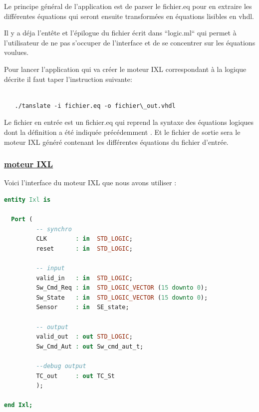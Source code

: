 \medskip

Le principe général de l'application est de parser le fichier.eq pour
en extraire les différentes équations qui seront ensuite transformées en
équations lisibles en vhdl.

\medskip

Il y a déja l'entête et l'épilogue du fichier écrit dans ``logic.ml`` qui
permet à l'utilisateur de ne pas s'occuper de l'interface et de se
concentrer sur les équations voulues.

\medskip

Pour lancer l'application qui va créer le moteur IXL correspondant à la logique décrite il faut taper l'instruction suivante:

\begin{lstlisting}

   ./tanslate -i fichier.eq -o fichier\_out.vhdl

\end{lstlisting}




Le fichier en entrée est un fichier.eq qui reprend la syntaxe des
équations logiques dont la définition a été indiquée précédemment  \cite{}.
Et le fichier de sortie sera le moteur IXL généré contenant les
différentes équations du fichier d'entrée.

\newpage

\subsubsection{\underline{moteur IXL}}
\label{sec:IXL}

Voici l'interface du moteur IXL que nous avons utiliser :

\begin{lstlisting}[language=vhdl]
entity Ixl is  

  Port (
         -- synchro   
         CLK        : in  STD_LOGIC;
         reset      : in  STD_LOGIC;

         -- input
         valid_in   : in  STD_LOGIC; 
         Sw_Cmd_Req : in  STD_LOGIC_VECTOR (15 downto 0);
         Sw_State   : in  STD_LOGIC_VECTOR (15 downto 0);
         Sensor     : in  SE_state;
         
         -- output
         valid_out  : out STD_LOGIC;
         Sw_Cmd_Aut : out Sw_cmd_aut_t;

         --debug output
         TC_out     : out TC_St
         );

end Ixl;

\end{lstlisting}

